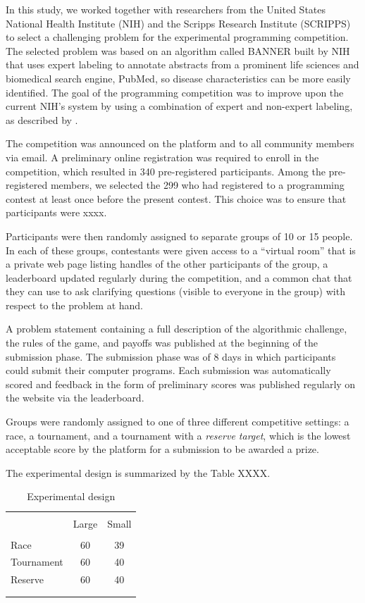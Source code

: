 \documentclass[12pt,]{article}
\begin{document}
In this study, we worked together with researchers from the United
States National Health Institute (NIH) and the Scripps Research
Institute (SCRIPPS) to select a challenging problem for the experimental
programming competition. The selected problem was based on an algorithm
called BANNER built by NIH \citep{leaman2008banner} that uses expert
labeling to annotate abstracts from a prominent life sciences and
biomedical search engine, PubMed, so disease characteristics can be more
easily identified. The goal of the programming competition was to
improve upon the current NIH's system by using a combination of expert
and non-expert labeling, as described by \citet{good2014microtask}.

The competition was announced on the platform and to all community
members via email. A preliminary online registration was required to
enroll in the competition, which resulted in 340 pre-registered
participants. Among the pre-registered members, we selected the 299 who
had registered to a programming contest at least once before the present
contest. This choice was to ensure that participants were xxxx.

Participants were then randomly assigned to separate groups of 10 or 15
people. In each of these groups, contestants were given access to a
``virtual room'' that is a private web page listing handles of the other
participants of the group, a leaderboard updated regularly during the
competition, and a common chat that they can use to ask clarifying
questions (visible to everyone in the group) with respect to the problem
at hand.

A problem statement containing a full description of the algorithmic
challenge, the rules of the game, and payoffs was published at the
beginning of the submission phase. The submission phase was of 8 days in
which participants could submit their computer programs. Each submission
was automatically scored and feedback in the form of preliminary scores
was published regularly on the website via the leaderboard.

Groups were randomly assigned to one of three different competitive
settings: a race, a tournament, and a tournament with a \emph{reserve
target}, which is the lowest acceptable score by the platform for a
submission to be awarded a prize.

The experimental design is summarized by the Table XXXX.

\begin{table}
\centering
\caption{Experimental design}
\label{tab: experimental design}
\begin{tabular}{@{}lcc}
  \\[-1.8ex]\hline \hline \\[-1.8ex]
 & Large & Small \\ 
  \hline \\[-1.86ex]
Race & 60 & 39 \\ 
  Tournament & 60 & 40 \\ 
  Reserve & 60 & 40 \\ 
   \\[-1.8ex]\hline \hline \\[-1.8ex]
\end{tabular}
\end{table}
\end{document}
